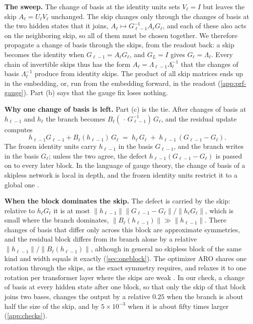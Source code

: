 \documentclass[10pt]{article}
\theoremstyle{definition}
\theoremstyle{remark}
\newcommand{\norm}[1]{\lVert #1\rVert}
\newcommand{\para}[1]{\smallskip\noindent\textbf{#1}\hspace{0.5em}}
\begin{document}
\para{The sweep.} The change of basis at the identity units sets $V_\ell = I$ but leaves the skip $A_\ell = U_\ell V_\ell$ unchanged. The skip changes only through the changes of basis at the two hidden states that it joins, $A_\ell \mapsto G_{\ell-1}^{-1}A_\ell G_\ell$, and each of these also acts on the neighboring skip, so all of them must be chosen together. We therefore propagate a change of basis through the skips, from the readout back: a skip becomes the identity when $G_{\ell-1} = A_\ell G_\ell$, and $G_L = I$ gives $G_\ell = \Lambda_\ell$. Every chain of invertible skips thus has the form $A_\ell = \Lambda_{\ell-1}\Lambda_\ell^{-1}$ that the changes of basis $\Lambda_\ell^{-1}$ produce from identity skips. The product of all skip matrices ends up in the embedding, or, run from the embedding forward, in the readout (\cref{app:prf-gauge}). Part (b) says that the gauge fix loses nothing.

\para{Why one change of basis is left.} Part (c) is the tie. After changes of basis at $h_{\ell-1}$ and $h_\ell$ the branch becomes $B_\ell(\,\cdot\,G_{\ell-1}^{-1})\,G_\ell$, and the residual update computes
\begin{equation}\label{eq:defect}
h_{\ell-1}G_{\ell-1} + B_\ell(h_{\ell-1})\,G_\ell \;=\; h_\ell\,G_\ell \;+\; h_{\ell-1}\,(G_{\ell-1} - G_\ell).
\end{equation}
The frozen identity units carry $h_{\ell-1}$ in the basis $G_{\ell-1}$, and the branch writes in the basis $G_\ell$; unless the two agree, the defect $h_{\ell-1}(G_{\ell-1} - G_\ell)$ is passed on to every later block. In the language of gauge theory, the change of basis of a skipless network is local in depth, and the frozen identity units restrict it to a global one \citep{hashimoto2024unification}.

\para{When the block dominates the skip.} The defect is carried by the skip: relative to $h_\ell G_\ell$ it is at most $\norm{h_{\ell-1}}\norm{G_{\ell-1} - G_\ell}/\norm{h_\ell G_\ell}$, which is small where the branch dominates, $\norm{B_\ell(h_{\ell-1})} \gg \norm{h_{\ell-1}}$. There changes of basis that differ only across this block are approximate symmetries, and the residual block differs from its branch alone by a relative $\norm{h_{\ell-1}}/\norm{B_\ell(h_{\ell-1})}$, although in general no skipless block of the same kind and width equals it exactly (\cref{sec:oneblock}). The optimizer ARO shares one rotation through the skips, as the exact symmetry requires, and relaxes it to one rotation per transformer layer where the skips are weak \citep[Section~6.4]{gong2026aro}. In our check, a change of basis at every hidden state after one block, so that only the skip of that block joins two bases, changes the output by a relative $0.25$ when the branch is about half the size of the skip, and by $5\times10^{-3}$ when it is about fifty times larger (\cref{app:checks}).
\end{document}
